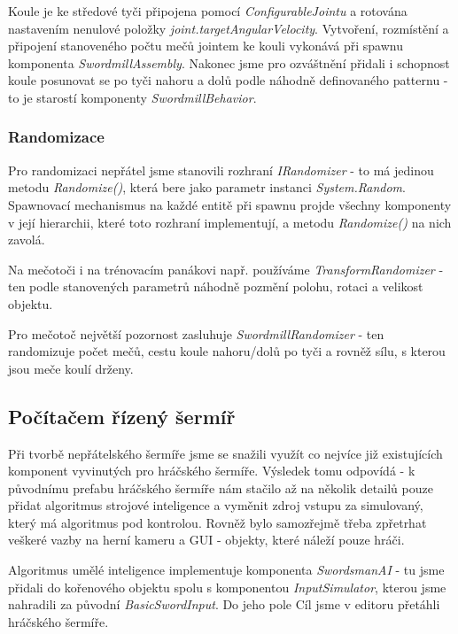 Koule je ke středové tyči připojena pomocí \textit{ConfigurableJointu} a rotována nastavením nenulové položky \textit{joint.targetAngularVelocity}. Vytvoření, rozmístění a připojení stanoveného počtu mečů jointem ke kouli vykonává při spawnu komponenta \textit{SwordmillAssembly}. Nakonec jsme pro ozváštnění přidali i schopnost koule posunovat se po tyči nahoru a dolů podle náhodně definovaného patternu - to je starostí komponenty \textit{SwordmillBehavior}.

\subsubsection*{Randomizace}

Pro randomizaci nepřátel jsme stanovili rozhraní \textit{IRandomizer} - to má jedinou metodu \textit{Randomize()}, která bere jako parametr instanci \textit{System.Random}. Spawnovací mechanismus na každé entitě při spawnu projde všechny komponenty v její hierarchii, které toto rozhraní implementují, a metodu \textit{Randomize()} na nich zavolá.

Na mečotoči i na trénovacím panákovi např. používáme \textit{TransformRandomizer} - ten podle stanovených parametrů náhodně pozmění polohu, rotaci a velikost objektu.

Pro mečotoč největší pozornost zasluhuje \textit{SwordmillRandomizer} - ten randomizuje počet mečů, cestu koule nahoru/dolů po tyči a rovněž sílu, s kterou jsou meče koulí drženy.


\subsection{Počítačem řízený šermíř} \label{knightEnemySubsection}

Při tvorbě nepřátelského šermíře jsme se snažili využít co nejvíce již existujících komponent vyvinutých pro hráčského šermíře. Výsledek tomu odpovídá - k původnímu prefabu hráčského šermíře nám stačilo až na několik detailů pouze přidat algoritmus strojové inteligence a vyměnit zdroj vstupu za simulovaný, který má algoritmus pod kontrolou. Rovněž bylo samozřejmě třeba zpřetrhat veškeré vazby na herní kameru a GUI - objekty, které náleží pouze hráči.

Algoritmus umělé inteligence implementuje komponenta \textit{SwordsmanAI} - tu jsme přidali do kořenového objektu spolu s komponentou \textit{InputSimulator}, kterou jsme nahradili za původní \textit{BasicSwordInput}. Do jeho pole Cíl jsme v editoru přetáhli hráčského šermíře.


